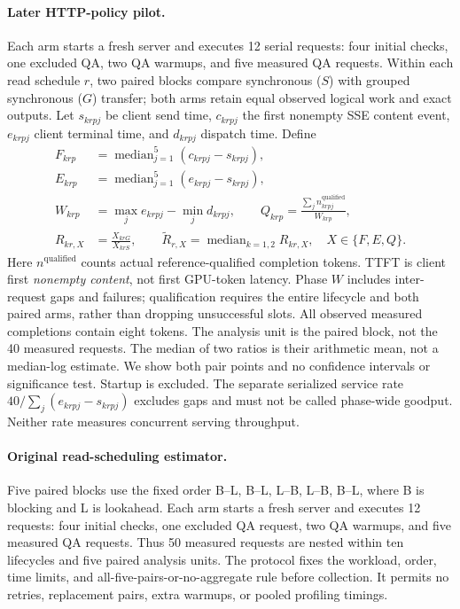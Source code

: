 \paragraph{Later HTTP-policy pilot.}
Each arm starts a fresh server and executes 12 serial requests: four initial
checks, one excluded QA, two QA warmups, and five measured QA requests.
Within each read schedule $r$, two paired blocks compare synchronous ($S$)
with grouped synchronous ($G$) transfer; both arms retain equal observed
logical work and exact outputs. Let $s_{krpj}$ be client send time,
$c_{krpj}$ the first nonempty SSE content event, $e_{krpj}$ client terminal
time, and $d_{krpj}$ dispatch time. Define
\begin{equation}
\begin{aligned}
 F_{krp}&=\operatorname{median}_{j=1}^{5}(c_{krpj}-s_{krpj}),\\
 E_{krp}&=\operatorname{median}_{j=1}^{5}(e_{krpj}-s_{krpj}),\\
 W_{krp}&=\max_j e_{krpj}-\min_j d_{krpj},\qquad
 Q_{krp}=\frac{\sum_j n^{\mathrm{qualified}}_{krpj}}{W_{krp}},\\
 R_{kr,X}&=\frac{X_{krG}}{X_{krS}},\qquad
 \widetilde R_{r,X}=\operatorname{median}_{k=1,2}R_{kr,X},
 \quad X\in\{F,E,Q\}.
\end{aligned}
\label{eq:http-policy-estimator}
\end{equation}
Here $n^{\mathrm{qualified}}$ counts actual reference-qualified completion
tokens. TTFT is client first \emph{nonempty content}, not first GPU-token
latency. Phase $W$ includes inter-request gaps and failures; qualification
requires the entire lifecycle and both paired arms, rather than dropping
unsuccessful slots. All observed measured completions contain eight tokens.
The analysis unit is the paired block, not the 40 measured requests.
The median of two ratios is their arithmetic mean, not a median-log estimate.
We show both pair points and no confidence intervals or significance test.
Startup is excluded. The separate serialized service rate
$40/\sum_j(e_{krpj}-s_{krpj})$ excludes gaps and must not be called phase-wide
goodput. Neither rate measures concurrent serving throughput.

\paragraph{Original read-scheduling estimator.}
Five paired blocks use the fixed order B--L, B--L, L--B, L--B, B--L, where
B is blocking and L is lookahead. Each arm starts a fresh server and executes
12 requests: four initial checks, one excluded QA request, two QA warmups,
and five measured QA requests. Thus 50 measured requests are nested within
ten lifecycles and five paired analysis units. The protocol fixes the
workload, order, time limits, and all-five-pairs-or-no-aggregate rule before
collection. It permits no retries, replacement pairs, extra warmups, or
pooled profiling timings.

